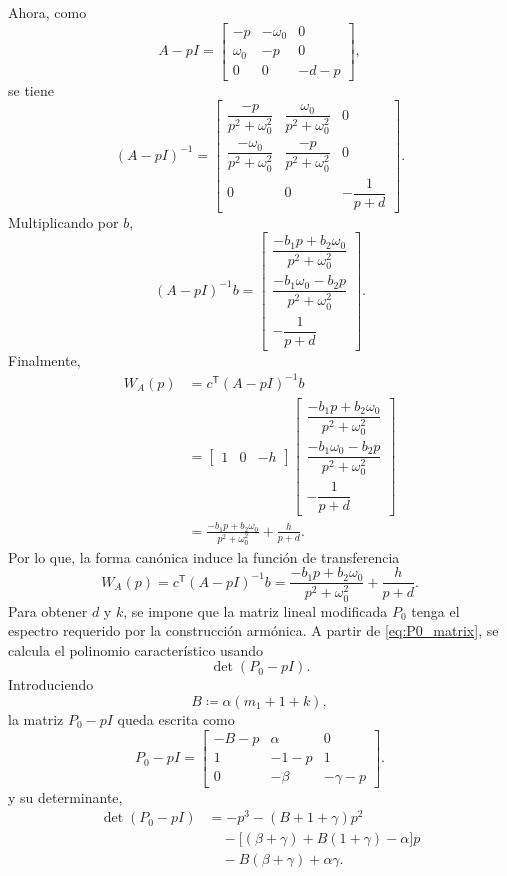 \documentclass[journal]{IEEEtran}
\begin{document}
\noindent Ahora, como
\[
A-pI=
\begin{bmatrix}
-p & -\omega_0 & 0\\
\omega_0 & -p & 0\\
0 & 0 & -d-p
\end{bmatrix},
\]
se tiene
\[
(A-pI)^{-1}
=
\begin{bmatrix}
\dfrac{-p}{p^2+\omega_0^2} &
\dfrac{\omega_0}{p^2+\omega_0^2} &
0\\[2mm]
\dfrac{-\omega_0}{p^2+\omega_0^2} &
\dfrac{-p}{p^2+\omega_0^2} &
0\\[2mm]
0&0&-\dfrac{1}{p+d}
\end{bmatrix}.
\]
Multiplicando por \(b\),
\[
(A-pI)^{-1}b
=
\begin{bmatrix}
\dfrac{-b_1p+b_2\omega_0}{p^2+\omega_0^2}\\[2mm]
\dfrac{-b_1\omega_0-b_2p}{p^2+\omega_0^2}\\[2mm]
-\dfrac{1}{p+d}
\end{bmatrix}.
\]
Finalmente,
\[
\begin{aligned}
W_A(p)
&=c^\mathsf{T}(A-pI)^{-1}b\\
&=
\begin{bmatrix}
1&0&-h
\end{bmatrix}
\begin{bmatrix}
\dfrac{-b_1p+b_2\omega_0}{p^2+\omega_0^2}\\[2mm]
\dfrac{-b_1\omega_0-b_2p}{p^2+\omega_0^2}\\[2mm]
-\dfrac{1}{p+d}
\end{bmatrix}\\
&=
\frac{-b_1p+b_2\omega_0}{p^2+\omega_0^2}
+\frac{h}{p+d}.
\end{aligned}
\]
\noindent Por lo que, la forma canónica induce la función de transferencia
\begin{equation}\label{eq:WA}
W_A(p)=c^\mathsf{T}(A-pI)^{-1}b
=\frac{-b_1p+b_2\omega_0}{p^2+\omega_0^2}+\frac{h}{p+d}.
\end{equation}
\noindent Para obtener \(d\) y \(k\), se impone que la matriz lineal modificada \(P_0\) tenga el espectro requerido por la construcción
armónica. A partir de \eqref{eq:P0_matrix}, se calcula el polinomio
característico usando
\[
\det(P_0-pI).
\]
Introduciendo
\[
B\coloneqq \alpha(m_1+1+k),
\]
la matriz \(P_0-pI\) queda escrita como
\[
P_0-pI=
\begin{bmatrix}
-B-p & \alpha & 0\\
1 & -1-p & 1\\
0 & -\beta & -\gamma-p
\end{bmatrix}.
\]
y su determinante,
\begin{equation}
\begin{aligned}
\det(P_0-pI)
&=
-p^3-(B+1+\gamma)p^2\\
&\quad
-\bigl[(\beta+\gamma)+B(1+\gamma)-\alpha\bigr]p\\
&\quad
-B(\beta+\gamma)+\alpha\gamma .
\end{aligned}
\label{eq:detP0B}
\end{equation}
\end{document}
